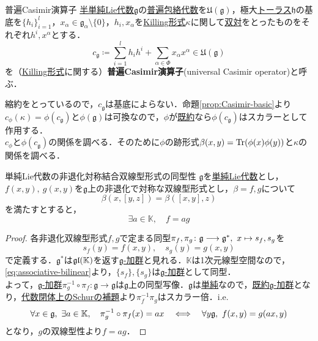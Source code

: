 \documentclass[rep_main]{subfiles}
\begin{document}
\begin{mydef}[label=def:univ-Casimir-op]{普遍Casimir演算子}
	\hyperref[def:semisimple-LieAlg]{半単純Lie代数}$\mathfrak{g}$の\hyperref[def:univ-env-alg]{普遍包絡代数}を$\mathfrak{U}(\mathfrak{g})$，極大\hyperref[def:toral-subLieAlg]{トーラス}$\mathfrak{h}$の基底を$\{h_i\}_{i=1}^l$，$x_\alpha \in \mathfrak{g}_\alpha \setminus \{0\}$，$h_i, x_\alpha$を\hyperref[def:Killing-form]{Killing形式}$\kappa$に関して\hyperref[lem:Casimir]{双対}をとったものをそれぞれ$h^i, x^\alpha$とする．
	\begin{equation}
		c_\mathfrak{g} \coloneqq \sum_{i=1}^l h_ih^i + \sum_{\alpha \in \Phi} x_\alpha x^\alpha \in \mathfrak{U}(\mathfrak{g})
	\end{equation}
	を（\hyperref[def:Killing-form]{Killing形式}に関する）\textbf{普遍Casimir演算子}(universal Casimir operator)と呼ぶ．
\end{mydef}
縮約をとっているので，$c_\mathfrak{g}$は基底によらない．命題\ref{prop:Casimir-basic}より$c_\phi(\kappa) = \phi(c_\mathfrak{g})$と$\phi(\mathfrak{g})$は可換なので，$\phi$が\hyperref[def:irr]{既約}なら$\phi(c_\mathfrak{g})$はスカラーとして作用する．\\
$c_\phi$と$\phi(c_\mathfrak{g})$の関係を調べる．そのために$\phi$の跡形式$\beta(x, y) = \Tr(\phi(x)\phi(y))$と$\kappa$の関係を調べる．
\begin{mylem}[label=lem:trace-form-simple]{単純Lie代数の非退化対称結合双線型形式の同型性}
	$\mathfrak{g}$を\hyperref[def:simple-LieAlg]{単純Lie代数}とし，$f(x, y),\ g(x, y)$を$\mathfrak{g}$上の非退化で対称な双線型形式とし，$\beta = f, g$について
	\begin{equation}
		\label{eq:associative-bilinear}
		\beta(x, [y, z]) = \beta([x, y], z)
	\end{equation}
	を満たすとすると，
	\begin{equation}
		\exists a \in \mathbb{K},\quad  f = ag
	\end{equation}
\end{mylem}
\begin{proof}
	各非退化双線型形式$f, g$で定まる同型$\pi_f, \pi_g\colon \mathfrak{g} \longrightarrow \mathfrak{g}^*,\ x \mapsto s_f, s_g$を
	\begin{equation}
		s_f(y) = f(x, y),\quad  s_g(y) = g(x, y)
	\end{equation}
	で定義する．$\mathfrak{g}^*$は$\mathfrak{gl}(\mathbb{K})$を返す\hyperref[ax:g-module]{$\mathfrak{g}$-加群}と見れる．$\mathbb{K}$は1次元線型空間なので，\eqref{eq:associative-bilinear}より，$\{s_f\}, \{s_g\}$は\hyperref[ax:g-module]{$\mathfrak{g}$-加群}として同型．\\
	よって，\hyperref[ax:g-module]{$\mathfrak{g}$-加群}$\pi_g^{-1}\circ\pi_f\colon \mathfrak{g} \to \mathfrak{g}$は$\mathfrak{g}$上の同型写像．$\mathfrak{g}$は\hyperref[def:simple-LieAlg]{単純}なので，\hyperref[def:irr]{既約$\mathfrak{g}$-加群}となり，\hyperref[col:Schur-closed]{代数閉体上のSchurの補題}より$\pi_f^{-1}\pi_g$はスカラー倍．i.e.
	\begin{equation}
		\forall x \in \mathfrak{g},\ \exists a \in \mathbb{K},\quad  \pi_g^{-1}\circ\pi_f(x) = ax  \quad \Longleftrightarrow \quad  \forall y \mathfrak{g},\ f(x, y) = g(ax, y)
	\end{equation}
	となり，$g$の双線型性より$f = ag$．
\end{proof}
\end{document}
